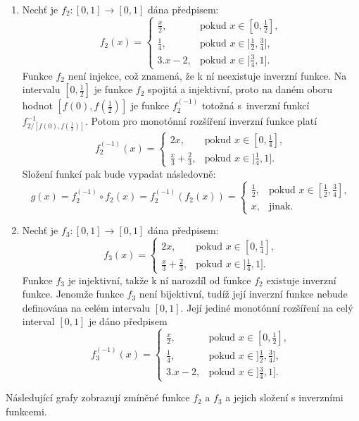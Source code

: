 \begin{example}
\label{sec: funkce}
\cite{hlinena}
\begin{enumerate}
    \item Nech\v t je $f_2:[0,1] \rightarrow [0,1]$ dána předpisem:
    $$f_2(x)= \begin{cases} \frac x2, & \mbox {pokud $x \in [0,\frac 12],$}
    \\ \frac 14, & \mbox {pokud $x \in ]\frac 12,\frac 34],$}
    \\ 3.x-2, & \mbox {pokud $x \in ]\frac 34,1]$.}
    \end{cases}$$
    Funkce $f_2$ není injekce, což znamená, že k ní neexistuje inverzní funkce. Na intervalu $[0,\frac 12]$ je funkce $f_2$ spojitá a injektivní, proto na daném oboru hodnot $[f(0),f(\frac 12)]$ je
    funkce $f_2^{(-1)}$ totožná s~inverzní funkcí
    $f_{2/[f(0),f(\frac 12)]}^{-1}.$
    Potom pro monot\'onní rozšíření inverzní funkce plat\'i
    $$f_2^{(-1)}(x)= \begin{cases} 2x, & \mbox {pokud $x \in [0,\frac 14],$}
    \\ \frac x3 + \frac 23, & \mbox {pokud $x \in ]\frac 14,1].$}
    \end{cases}$$
    Složení funkcí pak bude vypadat následovně:
    $$g(x)=f_2^{(-1)} \circ f_2(x)=f_2^{(-1)} \left(f_2(x)\right)= \begin{cases} \frac 12,
    & \mbox{pokud $x \in [\frac 12,\frac 34],$}
    \\x, & \mbox {jinak.} \end{cases}$$
    
    \item Nech\v t je $f_3:[0,1] \rightarrow [0,1]$ dána předpisem:
    $$f_3(x)= \begin{cases} 2x, & \mbox {pokud $x \in [0,\frac 14],$}
    \\ \frac x3 + \frac 23, & \mbox {pokud $x \in ]\frac 14,1].$}
    \end{cases}$$
    Funkce $f_3$ je injektivní, takže k ní narozdíl od funkce $f_2$ existuje inverzní funkce. Jenomže funkce $f_3$ není bijektivní, tudíž její inverzní funkce nebude definována na celém intervalu $[0,1]$. 
    Její jediné monot\' onní rozšíření na celý interval $[0,1]$ je dáno předpisem
    $$f_3^{(-1)}(x)= \begin{cases} \frac x2, & \mbox {pokud $x \in [0,\frac 12],$}
    \\ \frac 14, & \mbox {pokud $x \in ]\frac 12,\frac 34],$}
    \\ 3.x-2, & \mbox {pokud $x \in ]\frac 34,1]$.}
    \end{cases}$$
\end{enumerate}
\end{example}
Následující grafy zobrazují zmíněné funkce $f_2$ a $f_3$ a jejich složení s inverzními funkcemi.

